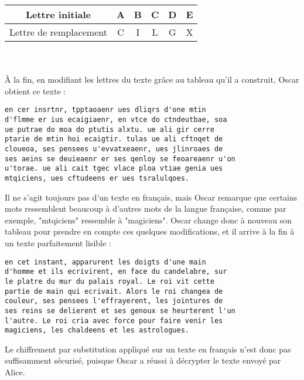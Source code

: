 		\begin{tabular}{ | c | c | c | c | c | c | }
			\hline
			Lettre initiale & A & B & C & D & E \\ \hline
			Lettre de remplacement & C & I & L & G & X\\
			\hline
		\end{tabular}\\
		\\
		À la fin, en modifiant les lettres du texte grâce au tableau qu'il a construit, Oscar obtient ce texte :
		\begin{lstlisting}
en cer insrtnr, tpptaoaenr ues dliqrs d'one mtin
d'flmme er ius ecaigiaenr, en vtce do ctndeutbae, soa
ue putrae do moa do ptutis alxtu. ue ali gir cerre
ptarie de mtin hoi ecaigtir. tulas ue ali cftnqet de
cloueoa, ses pensees u'evvatxeaenr, ues jlinroaes de
ses aeins se deuieaenr er ses qenloy se feoareaenr u'on
u'torae. ue ali cait tgec vlace ploa vtiae genia ues
mtqiciens, ues cftudeens er ues tsralulqoes.
		\end{lstlisting}
		Il ne s'agit toujours pas d'un texte en français, mais Oscar remarque que certains mots ressemblent beaucoup à d'autres mots de la langue française, comme par exemple, "mtqiciens" ressemble à "magiciens". Oscar change donc à nouveau son tableau pour prendre en compte ces quelques modifications, et il arrive à la fin à un texte parfaitement lisible :
		\begin{lstlisting}
en cet instant, apparurent les doigts d'une main
d'homme et ils ecrivirent, en face du candelabre, sur
le platre du mur du palais royal. Le roi vit cette
partie de main qui ecrivait. Alors le roi changea de
couleur, ses pensees l'effrayerent, les jointures de
ses reins se delierent et ses genoux se heurterent l'un
l'autre. Le roi cria avec force pour faire venir les
magiciens, les chaldeens et les astrologues.
		\end{lstlisting}
		Le chiffrement par substitution appliqué sur un texte en français n'est donc pas suffisamment sécurisé, puisque Oscar a réussi à décrypter le texte envoyé par Alice.